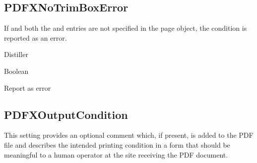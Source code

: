 \documentclass[letterpaper,12pt,english,openany,oneside]{sphinxmanual}
\begin{document}
\label{\detokenize{PDF_Create_CommonSettings:default-value-106}}

\begin{sphinxVerbatim}[commandchars=\\\{\}]
\end{sphinxVerbatim}




\subsection{PDFXNoTrimBoxError}
\label{\detokenize{PDF_Create_CommonSettings:pdfxnotrimboxerror}}
If  and both the  and  entries are not specified in the page object, the condition is reported as an error.

\label{\detokenize{PDF_Create_CommonSettings:supported-by-113}}

Distiller

\label{\detokenize{PDF_Create_CommonSettings:type-112}}

Boolean

\label{\detokenize{PDF_Create_CommonSettings:ui-name-94}}

Report as error

\label{\detokenize{PDF_Create_CommonSettings:default-value-107}}

\begin{sphinxVerbatim}[commandchars=\\\{\}]
\end{sphinxVerbatim}




\subsection{PDFXOutputCondition}
\label{\detokenize{PDF_Create_CommonSettings:pdfxoutputcondition}}
This setting provides an optional comment which, if present, is added to the PDF file and describes the intended printing condition in a form that should be meaningful to a human operator at the site receiving the PDF document.

\label{\detokenize{PDF_Create_CommonSettings:supported-by-114}}
\end{document}
